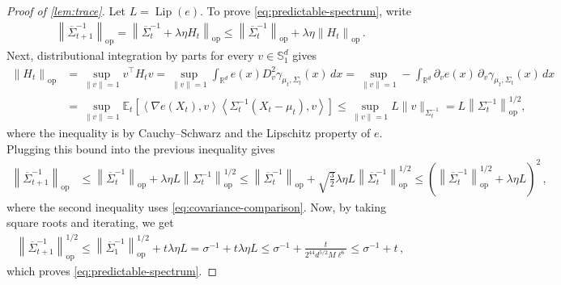 \documentclass[11pt]{article}
\newcommand{\R}{\mathbb R}
\newcommand{\E}{\mathbb E}
\newcommand{\Lip}{\operatorname{Lip}}
\newcommand{\op}{\mathrm{op}}
\newcommand{\1}{\mathbf 1}
\newcommand{\ip}[2]{\left\langle #1,#2\right\rangle}
\newcommand{\norm}[1]{\left\lVert #1\right\rVert}
\begin{document}
\begin{proof}[Proof of \cref{lem:trace}]
    Let $L=\Lip(e)$.
    To prove \eqref{eq:predictable-spectrum}, write
    \begin{align}
        \norm{\overline\Sigma_{t+1}^{-1}}_{\op}
        =
        \norm{\overline\Sigma_{t}^{-1} + \lambda\eta H_t}_{\op}
        \leq
        \norm{\overline\Sigma_{t}^{-1}}_{\op} + \lambda\eta\norm{H_t}_{\op}\,.
    \end{align}
    Next, distributional integration by parts for every $v\in\mathbb{S}_1^d$ gives
    \begin{align}
        \norm{H_t}_{\op}
         & =
        \sup_{\|v\|=1} v^\top H_t v
        =
        \sup_{\|v\|=1}
        \int_{\R^d}e(x) D^2_v\gamma_{\mu_t,\Sigma_t}(x)\,dx
        =
        \sup_{\|v\|=1}
        -\int_{\R^d}\partial_ve(x)\,
        \partial_v\gamma_{\mu_t,\Sigma_t}(x)\,dx
        \\
         & =
        \sup_{\|v\|=1}
        \E_t\left[
            \ip{\nabla e(X_t)}{v}
            \ip{\Sigma_t^{-1}(X_t-\mu_t)}{v}
            \right]
        \leq
        \sup_{\|v\|=1}
        L \|v\|_{\Sigma_t^{-1}}
        =
        L \norm{\Sigma_t^{-1}}_{\op}^{1/2},
        \label{eq:H-quadratic-bound}
    \end{align}
    where the inequality is by Cauchy--Schwarz and the Lipschitz property of $e$.
    Plugging this bound into the previous inequality gives
    \begin{align}
        \norm{\overline\Sigma_{t+1}^{-1}}_{\op}
         & \leq
        \norm{\overline\Sigma_{t}^{-1}}_{\op} + \lambda\eta L \norm{\Sigma_t^{-1}}_{\op}^{1/2}
        \leq
        \norm{\overline\Sigma_{t}^{-1}}_{\op} + \sqrt{\frac{3}{2}}\lambda\eta L\norm{\overline\Sigma_{t}^{-1}}_{\op}^{1/2}
        \leq
        \left(\norm{\overline\Sigma_{t}^{-1}}_{\op}^{1/2} + \lambda\eta L\right)^2\,,
        \label{eq:predictable-spectrum-bound}
    \end{align}
    where the second inequality uses \eqref{eq:covariance-comparison}.
    Now, by taking square roots and iterating, we get
    \begin{align}
        \norm{\overline\Sigma_{t+1}^{-1}}_{\op}^{1/2}
        \leq
        \norm{\overline\Sigma_1^{-1}}_{\op}^{1/2} + t\lambda\eta L
        = \sigma^{-1}+t\lambda\eta L
        \leq
        \sigma^{-1}
        +\frac{t}{2^{44}d^{5/2}M\ell^6}
        \leq
        \sigma^{-1} + t\,,
    \end{align}
    which proves \eqref{eq:predictable-spectrum}.



\end{proof}
\end{document}
